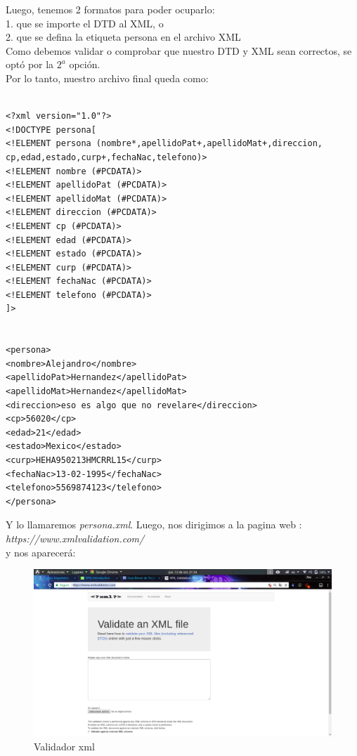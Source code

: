 \documentclass[12pt,letterpaper]{article}
\begin{document}
\vspace{5mm}
Luego, tenemos 2 formatos para poder ocuparlo:\\
1. que se importe el DTD al XML, o\\
2. que se defina la etiqueta persona en el archivo XML
\\

Como debemos validar o comprobar que nuestro DTD y XML sean correctos, se opt\'o por la $2^a$ opci\'on.
\\
Por lo tanto, nuestro archivo final queda como:

\begin{minipage}[t]{8cm}
{
\begin{verbatim}

<?xml version="1.0"?>
<!DOCTYPE persona[
<!ELEMENT persona (nombre*,apellidoPat+,apellidoMat+,direccion,
cp,edad,estado,curp+,fechaNac,telefono)>
<!ELEMENT nombre (#PCDATA)>
<!ELEMENT apellidoPat (#PCDATA)>
<!ELEMENT apellidoMat (#PCDATA)>
<!ELEMENT direccion (#PCDATA)>
<!ELEMENT cp (#PCDATA)>
<!ELEMENT edad (#PCDATA)>
<!ELEMENT estado (#PCDATA)>
<!ELEMENT curp (#PCDATA)>
<!ELEMENT fechaNac (#PCDATA)>
<!ELEMENT telefono (#PCDATA)>
]>


<persona>
<nombre>Alejandro</nombre>
<apellidoPat>Hernandez</apellidoPat>
<apellidoMat>Hernandez</apellidoMat>
<direccion>eso es algo que no revelare</direccion>
<cp>56020</cp>
<edad>21</edad>
<estado>Mexico</estado>
<curp>HEHA950213HMCRRL15</curp>
<fechaNac>13-02-1995</fechaNac>
<telefono>5569874123</telefono>
</persona>

\end{verbatim}
}
\end{minipage}
\newpage
Y lo llamaremos {\em persona.xml}. Luego, nos dirigimos a la pagina web :\\{\em https://www.xmlvalidation.com/} \\y nos aparecer\'a:
\begin{center}
\begin{figure}[h]
\includegraphics[width=400pt]{./imgs/xlmval.png}
\vspace{-2mm}
\caption{Validador xml}\label{figure 1}
\end{figure}
\end{center}
\newpage
\end{document}
